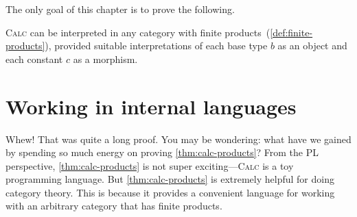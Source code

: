 The only goal of this chapter is to prove the following.
\begin{theorem} \label{thm:calc-products}
  \textsc{Calc} can be interpreted in any category with finite products~(\cref{def:finite-products}),
  provided suitable interpretations of each base type \(b\) as an object
  and each constant \(c\) as a morphism.
\end{theorem}



\section{Working in internal languages}

Whew! That was quite a long proof.
You may be wondering: what have we gained by spending so much energy on proving
\cref{thm:calc-products}?
From the PL perspective, \cref{thm:calc-products} is not super exciting---\textsc{Calc}
is a toy programming language.
But \cref{thm:calc-products} is extremely helpful for doing category theory.
This is because it provides a convenient language for working with an arbitrary
category that has finite products. 

